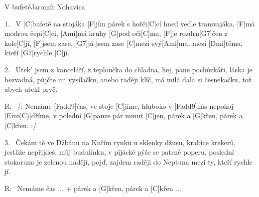 \begin{song}{V bufetě}{Jaromír Nohavica}

\begin{xverse}{1.~}
V [\large C]bufetě na stojáka [\large F]jím párek s hořči[\large C]cí
hned vedle tramvajáka, [\large F]má modrou čepi[\large C]ci,
[\large Ami]má kruhy [\large G]pod oči[\large C]ma, [\large F]je rozdrn[\large G7]{čen} z kole[\large C]jí,
[\large F]jsem zase, [\large G7]já jsem zase [\large C]mezi svý[\large Ami]ma, mezi [\large Dmi]těma, kteří [\large G7]rychle [\large C]jí.
\end{xverse}

\begin{xverse}{2.~}
Utek' jsem z kanceláří, z teploučka do chladna,
hej, pane pochůzkáři, láska je bezvadná,
půjčte mi vysílačku, anebo raději klíč,
má milá dala si česnekačku, tož abych utekl pryč.
\end{xverse}

\begin{xverse}{R:~}
/: Nemáme [\large Fadd9]{čas}, ve stoje [\large C]jíme,
hluboko v [\large Fadd9]{nás} nepokoj [\large Emi(C)]dříme,
v polední [\large G]pauze pár minut [\large C]jen,
párek a [\large G]křen, párek a [\large C]křen. :/
\end{xverse}

\begin{xverse}{3.~}
Čekám tě ve Džbánu na Kuřím rynku
u sklenky džusu, krabice krekerů,
jestliže nepřijdeš, můj budulínku,
v pijácké pýše se patrně poperu,
poslední stokoruna je zelenou nadějí,
pojď, zajdem raději do Neptuna mezi ty, kteří rychle jí.
\end{xverse}

\begin{xverse}{R:~}
Nemáme čas ...
+ párek a [\large G]křen, párek a [\large C]křen ...
\end{xverse}

\end{song}



